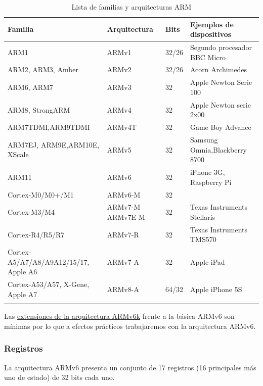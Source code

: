 \begin{longtable}{| p{4.2cm} | p{2.5cm} | p{1cm} | p{6cm} |}
\hline
{\bf Familia} & {\bf Arquitectura} & {\bf Bits} & {\bf Ejemplos de dispositivos} \\ \hline
ARM1      & ARMv1       & 32/26 & Segundo procesador BBC Micro \\ \hline
ARM2, ARM3, Amber & ARMv2      & 32/26 & Acorn Archimedes \\ \hline
ARM6, ARM7 & ARMv3      & 32 & Apple Newton Serie 100 \\ \hline
ARM8, StrongARM & ARMv4       & 32 & Apple Newton serie 2x00 \\ \hline
ARM7TDMI,\newline ARM9TDMI & ARMv4T & 32 & Game Boy Advance \\ \hline
ARM7EJ, ARM9E,\newline ARM10E, XScale & ARMv5 & 32 & Samsung Omnia,\newline Blackberry 8700 \\ \hline
ARM11     & ARMv6 & 32 & iPhone 3G, Raspberry Pi \\ \hline
Cortex-M0/M0+/M1 & ARMv6-M & 32 & \\ \hline
Cortex-M3/M4 & ARMv7-M ARMv7E-M & 32 & Texas Instruments Stellaris \\ \hline
Cortex-R4/R5/R7 & ARMv7-R & 32 & Texas Instruments TMS570 \\ \hline
Cortex-A5/A7/A8/A9\newline A12/15/17, Apple A6 & ARMv7-A & 32 & Apple iPad \\ \hline
Cortex-A53/A57, X-Gene, Apple A7 & ARMv8-A & 64/32 & Apple iPhone 5S\\ \hline
\caption{Lista de familias y arquitecturas ARM}
\label{list_fam}
\end{longtable}

Las 
\textcolor{blue}{
  \href{http://infocenter.arm.com/help/index.jsp?topic=/com.arm.doc.ddi0301h/apbs02s02.html}
  {extensiones de la arquitectura ARMv6k}}
frente a la básica ARMv6 son mínimas
por lo que a efectos prácticos trabajaremos con la arquitectura ARMv6.

\subsubsection{Registros}
La arquitectura ARMv6 presenta un conjunto de 17 registros (16 principales
más uno de estado) de 32 bits cada uno.
\newline

